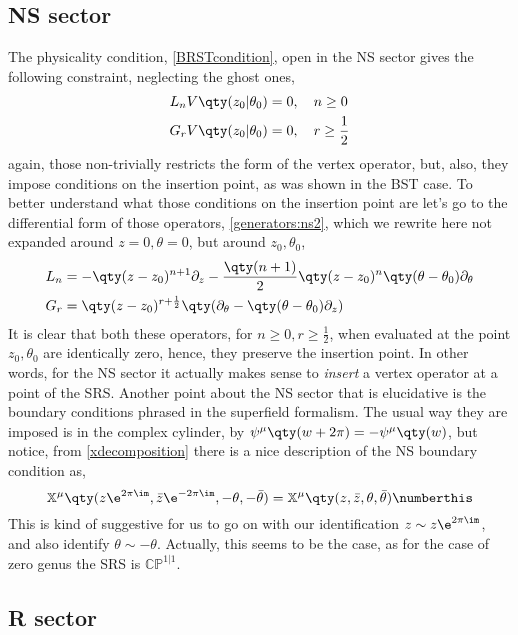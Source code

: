\subsection{NS sector}

The physicality condition, \cref{BRSTcondition}, open in the NS sector gives the following constraint, neglecting the ghost ones,
\begin{align*}
    L_n V\qty(z_0|\theta_0)&=0,\ \ \ n\geq 0\\
    G_r V\qty(z_0|\theta_0)&=0,\ \ \ r\geq \frac12
\end{align*}
again, those non-trivially restricts the form of the vertex operator, but, also, 
they impose conditions on the insertion point, as was shown in the BST case. To 
better understand what those conditions on the insertion point are let's go to the 
differential form of those operators, \cref{generators:ns2}, which we rewrite here not 
expanded around $z=0,\theta=0$, but around $z_0,\theta_0$,
\begin{align*}
    L_n&=-\qty(z-z_0)^{n+1}\partial_z-\frac{\qty(n+1)}{2}\qty(z-z_0)^n\qty(\theta-\theta_0)\partial_\theta\\
    G_r&=\qty(z-z_0)^{r+\frac12}\qty(\partial_\theta-\qty(\theta-\theta_0)\partial_z)
\end{align*}
It is clear that both these operators, for $n\geq0,r\geq\frac12$, when evaluated at the point $z_0,\theta_0$ are 
identically zero, hence, they preserve the insertion point. In other words, for the NS sector it actually 
makes sense to \textit{insert} a vertex operator at a point of the SRS. Another point about the NS sector 
that is elucidative is the boundary conditions phrased in the superfield formalism. The usual 
way they are imposed is in the complex cylinder, by $\psi^\mu\qty(w+2\pi)=-\psi^\mu\qty(w)$, but notice, 
from \cref{xdecomposition} there is a nice description of the NS boundary condition as, 
\[\mathbb X^\mu\qty(z\e^{2\pi\im},\bar z\e^{-2\pi\im},-\theta,-\bar\theta)=\mathbb X^\mu\qty(z,\bar z,\theta,\bar\theta)\numberthis\label{supernsboundary}\] 
This is kind of suggestive for us to go on with our identification $z\sim z\e^{2\pi\im}$, and also identify $\theta\sim-\theta$. 
Actually, this seems to be the case, as for the case of zero genus the SRS is $\mathbb{CP}^{1|1}$.

\subsection{R sector}

